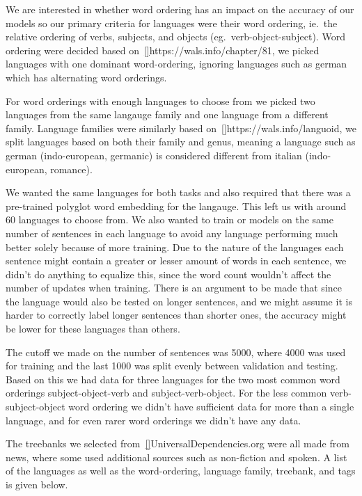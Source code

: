 We are interested in whether word ordering has an impact on the accuracy of our models so our primary criteria for languages were their word ordering, ie.\ the relative ordering of verbs, subjects, and objects (eg.\ verb-object-subject).
Word ordering were decided based on~\ref{}{https://wals.info/chapter/81}, we picked languages with one dominant word-ordering, ignoring languages such as german which has alternating word orderings. 

For word orderings with enough languages to choose from we picked two languages from the same langauge family and one language from a different family.
Language families were similarly based on~\ref{}{https://wals.info/languoid}, we split languages based on both their family and genus, meaning a language such as german (indo-european, germanic) is considered different from italian (indo-european, romance).

We wanted the same languages for both tasks and also required that there was a pre-trained polyglot word embedding for the langauge. 
This left us with around 60 languages to choose from. 
We also wanted to train or models on the same number of sentences in each language to avoid any language performing much better solely because of more training. 
Due to the nature of the languages each sentence might contain a greater or lesser amount of words in each sentence, we didn't do anything to equalize this, since the word count wouldn't affect the number of updates when training.
There is an argument to be made that since the language would also be tested on longer sentences, and we might assume it is harder to correctly label longer sentences than shorter ones, the accuracy might be lower for these languages than others. 

The cutoff we made on the number of sentences was 5000, where 4000 was used for training and the last 1000 was split evenly between validation and testing.
Based on this we had data for three languages for the two most common word orderings subject-object-verb and subject-verb-object.
For the less common verb-subject-object word ordering we didn't have sufficient data for more than a single language, and for even rarer word orderings we didn't have any data.

The treebanks we selected from~\ref{}{UniversalDependencies.org} were all made from news, where some used additional sources such as non-fiction and spoken.
A list of the languages as well as the word-ordering, language family, treebank, and tags is given below.

